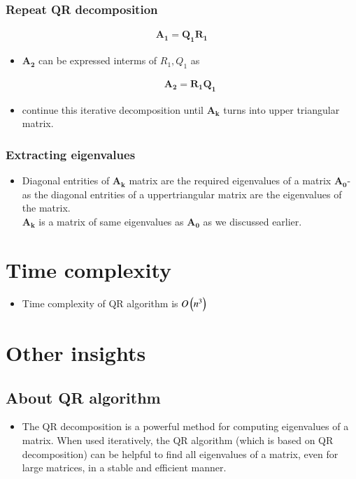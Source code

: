 \documentclass[journal]{IEEEtran}
\begin{document}
\subsubsection{Repeat QR decomposition}

\begin{align*}
    \mathbf{A_1=Q_1 R_1}
\end{align*}
\begin{itemize}
    \item $\mathbf{A_2}$ can be expressed interms of $R_{1}, Q_{1}$ as

\begin{align*}
    \mathbf{A_2 = R_{1} Q_{1}}
\end{align*}
   \item continue this iterative decomposition until $\mathbf{A_k}$ turns into upper triangular matrix.\\
\end{itemize}


\subsubsection{Extracting eigenvalues}
\begin{itemize}
    \item Diagonal entrities of $\mathbf{A_k}$ matrix are the required eigenvalues of a matrix $\mathbf{A_0}$- as the diagonal entrities of a uppertriangular matrix are the eigenvalues of the matrix.\\
    $\mathbf{A_k}$ is a matrix of same eigenvalues as $\mathbf{A_0}$ as we discussed earlier.\\
\end{itemize}

\section{Time complexity}

\begin{itemize}
    \item Time complexity of QR algorithm is $O\left(n^3\right)$\\
\end{itemize}

\section{Other insights}
\subsection{About QR algorithm}
\begin{itemize}
    \item The QR decomposition is a powerful method for computing eigenvalues of a matrix. When used iteratively, the QR algorithm (which is based on QR decomposition) can be helpful to find all eigenvalues of a matrix, even for large matrices, in a stable and efficient manner.
\end{itemize}
\end{document}

